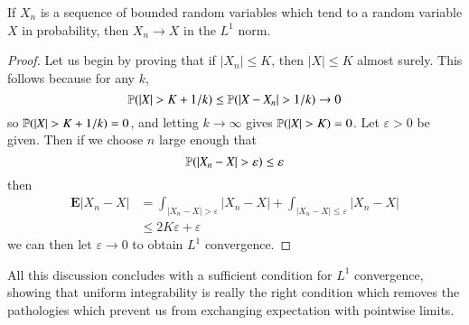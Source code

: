 \begin{theorem}
    If $X_n$ is a sequence of bounded random variables which tend to a random variable $X$ in probability, then $X_n \to X$ in the $L^1$ norm.
\end{theorem}
\begin{proof}
    Let us begin by proving that if $|X_n| \leq K$, then $|X| \leq K$ almost surely. This follows because for any $k$,
    \[ \operatorname{\mathbb{P}}(|X| > K + 1/k) \leq \operatorname{\mathbb{P}}(|X - X_n| > 1/k) \to 0 \]
    so $\operatorname{\mathbb{P}}(|X| > K + 1/k) = 0$, and letting $k \to \infty$ gives $\operatorname{\mathbb{P}}(|X| > K) = 0$. Let $\varepsilon > 0$ be given. Then if we choose $n$ large enough that
    \[ \operatorname{\mathbb{P}}(|X_n - X| > \varepsilon) \leq \varepsilon \]
    then
    \begin{align*}
        \mathbf{E}|X_n - X| &= \int_{|X_n - X| > \varepsilon} |X_n - X| + \int_{|X_n - X| \leq \varepsilon} |X_n - X|\\
        &\leq 2K\varepsilon + \varepsilon
    \end{align*}
    we can then let $\varepsilon \to 0$ to obtain $L^1$ convergence.
\end{proof}

All this discussion concludes with a sufficient condition for $L^1$ convergence, showing that uniform integrability is really the right condition which removes the pathologies which prevent us from exchanging expectation with pointwise limits.

